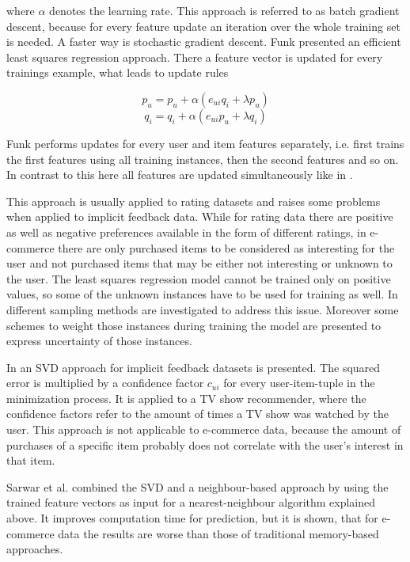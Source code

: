 \documentclass[10pt]{reportMaster}
\begin{document}
where $\alpha$ denotes the learning rate.
This approach is referred to as batch gradient descent, because for every feature update an iteration over the whole training set is needed.
A faster way is stochastic gradient descent.
Funk \cite{funkLeastSquares} presented an efficient least squares regression approach.
There a feature vector is updated for every trainings example, what leads to update rules 

\begin{equation}
	p_u = p_u + \alpha (e_{ui} q_i + \lambda p_u)
\end{equation}
\begin{equation}
	q_i = q_i + \alpha (e_{ui} p_u + \lambda q_i)
\end{equation}

Funk performs updates for every user and item features separately, i.e. first trains the first features using all training instances, then the second features and so on.
In contrast to this here all features are updated simultaneously like in \cite{matrixFactorizationDifRegParam}.

This approach is usually applied to rating datasets and raises some problems when applied to implicit feedback data.
While for rating data there are positive as well as negative preferences available in the form of different ratings, in e-commerce there are only purchased items to be considered as interesting for the user and not purchased items that may be either not interesting or unknown to the user.
The least squares regression model cannot be trained only on positive values, so some of the unknown instances have to be used for training as well.
In \cite{occf} different sampling methods are investigated to address this issue.
Moreover some schemes to weight those instances during training the model are presented to express uncertainty of those instances.

In \cite{CFForImplFeedback} an SVD approach for implicit feedback datasets is presented.
The squared error is multiplied by a confidence factor $c_{ui}$ for every user-item-tuple in the minimization process.
It is applied to a TV show recommender, where the confidence factors refer to the amount of times a TV show was watched by the user.
This approach is not applicable to e-commerce data, because the amount of purchases of a specific item probably does not correlate with the user's interest in that item.

Sarwar et al. \cite{nnOnSvd} combined the SVD and a neighbour-based approach by using the trained feature vectors as input for a nearest-neighbour algorithm explained above.
It improves computation time for prediction, but it is shown, that for e-commerce data the results are worse than those of traditional memory-based approaches.
\end{document}

